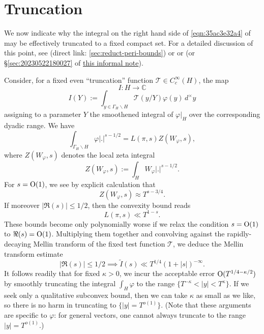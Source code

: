 \documentclass[reqno]{amsart} 
\numberwithin{equation}{section}
\numberwithin{theorem}{section}
\begin{document}
\section{Truncation}\label{sec:orgc98f847}
We now indicate why the integral on the right hand side of \eqref{eqn:35ac3e32a4} of may be effectively truncated to a fixed compact set.  For a detailed discussion of this point, see \cite[\S5.3]{2021arXiv210915230N} (direct link: \ref{sec:reduct-peri-bounds}) or \cite[\S5.1.4]{michel-2009} or \cite[\S3]{2020arXiv200406791S} (or \S\ref{sec:20230522180027} of \href{20230522T174726__shrinking-archimedean-families-second-moment-gl2.pdf}{this informal note}).

Consider, for a fixed even ``truncation'' function $\mathcal{T} \in C_c^\infty(H)$, the map
\begin{equation*}
  I : H \rightarrow \mathbb{C} 
\end{equation*}
\begin{equation*}
  I(Y) := \int _{y \in \Gamma_{H} \backslash H}  \mathcal{T}(y/Y) \varphi(y) \, d^\times y
\end{equation*}
assigning to a parameter $Y$ the smoothened integral of $\varphi|_H$ over the corresponding dyadic range.  We have
\begin{equation*}
  \int _{\Gamma_{H} \backslash H} \varphi |.|^{s-1/2} = L(\pi,s) Z(W_\varphi,s),
\end{equation*}
where $Z(W_\varphi,s)$ denotes the local zeta integral
\begin{equation*}
  Z(W_\varphi,s) := \int _{H} W_\varphi |.|^{s-1/2}.
\end{equation*}
For $s = \operatorname{O}(1)$, we see by explicit calculation that
\begin{equation*}
  Z(W_\varphi,s) \approx T^{s-3/4}.
\end{equation*}
If moreover $|\Re(s)| \leq 1/2$, then the convexity bound reads
\begin{equation*}
  L(\pi,s) \ll T^{1 - s}.
\end{equation*}
These bounds become only polynomially worse if we relax the condition $s = \operatorname{O}(1)$ to $\Re(s) = \operatorname{O}(1)$.  Multiplying them together and convolving against the rapidly-decaying Mellin transform of the fixed test function $\mathcal{T}$, we deduce the Mellin transform estimate
\begin{equation*}
|\Re(s)| \leq 1/2 \implies \tilde{I}(s) \ll T^{1/4} (1 + |s|)^{-\infty}.
\end{equation*}
It follows readily that for fixed $\kappa > 0$, we incur the acceptable error $\operatorname{O}(T^{1/4 -\kappa/2})$ by smoothly truncating the integral $\int_H \varphi$ to the range $\{T^{-\kappa} < |y| < T^{\kappa}\}$.  If we seek only a qualitative subconvex bound, then we can take $\kappa$ as small as we like, so there is no harm in truncating to $\{ |y| = T^{o(1)} \}$.  (Note that these arguments are specific to $\varphi$: for general vectors, one cannot always truncate to the range $|y| = T^{o(1)}$.)
\end{document}
